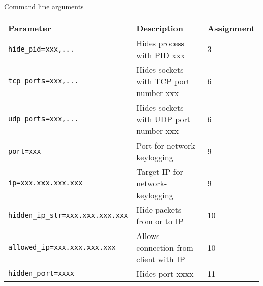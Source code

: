 \begin{subsubsection}{Command line arguments}
\begin{tabular}{|l|l|l|}
\hline
Parameter & Description & Assignment\\\hline
\texttt{hide\_pid=xxx,...} & Hides process with PID xxx & 3\\ \hline
\texttt{tcp\_ports=xxx,...}& Hides sockets with TCP port number xxx&6 \\ \hline
\texttt{udp\_ports=xxx,...}& Hides sockets with UDP port number xxx&6 \\ \hline
\texttt{port=xxx} & Port for network-keylogging&9 \\ \hline
\texttt{ip=xxx.xxx.xxx.xxx} & Target IP for network-keylogging&9 \\ \hline
\texttt{hidden\_ip\_str=xxx.xxx.xxx.xxx} & Hide packets from or to IP & 
10\\\hline
\texttt{allowed\_ip=xxx.xxx.xxx.xxx} & Allows connection from client with IP & 
10\\\hline
\texttt{hidden\_port=xxxx} & Hides port xxxx & 11\\ \hline
\end{tabular}
\end{subsubsection}
